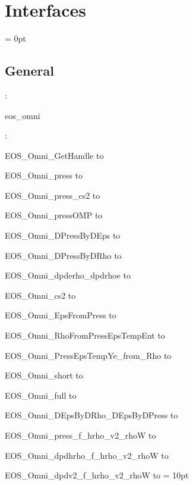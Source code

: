 
\section{Interfaces} 


\parskip = 0pt

\vspace{3mm} \subsection*{General}

: 

eos\_omni
\vspace{2mm}

\vspace{5mm}

: 



EOS\_Omni\_GetHandle to 

EOS\_Omni\_press to 

EOS\_Omni\_press\_cs2 to 

EOS\_Omni\_pressOMP to 

EOS\_Omni\_DPressByDEps to 

EOS\_Omni\_DPressByDRho to 

EOS\_Omni\_dpderho\_dpdrhoe to 

EOS\_Omni\_cs2 to 

EOS\_Omni\_EpsFromPress to 

EOS\_Omni\_RhoFromPressEpsTempEnt to 

EOS\_Omni\_PressEpsTempYe\_from\_Rho to 

EOS\_Omni\_short to 

EOS\_Omni\_full to 

EOS\_Omni\_DEpsByDRho\_DEpsByDPress to 

EOS\_Omni\_press\_f\_hrho\_v2\_rhoW to 

EOS\_Omni\_dpdhrho\_f\_hrho\_v2\_rhoW to 

EOS\_Omni\_dpdv2\_f\_hrho\_v2\_rhoW to 
\vspace{2mm}\parskip = 10pt 

